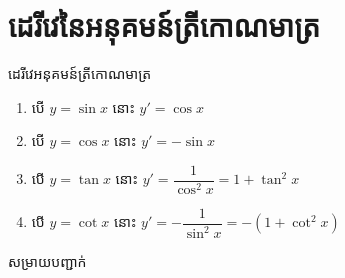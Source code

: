\documentclass[12pt,fleqn]{book} %
\newcommand{\solution}{{\begin{center}\kml \color{blue} សម្រាយបញ្ជាក់\end{center} }}
\begin{document}
\section{ដេរីវេនៃអនុគមន៍ត្រីកោណមាត្រ}
\begin{property}
ដេរីវេអនុគមន៍ត្រីកោណមាត្រ
\begin{enumerate}
\item បើ $y=\sin x$ នោះ $y'=\cos x$ 
\item បើ $y=\cos x$ នោះ $y'=-\sin x$
\item បើ $y=\tan x$ នោះ $y'=\dfrac{1}{\cos^2 x}=1+\tan^2 x$
\item បើ $y=\cot x$ នោះ $y'=-\dfrac{1}{\sin^2 x}=-(1+\cot^2 x)$
\end{enumerate}
\end{property}
\solution
\end{document}
